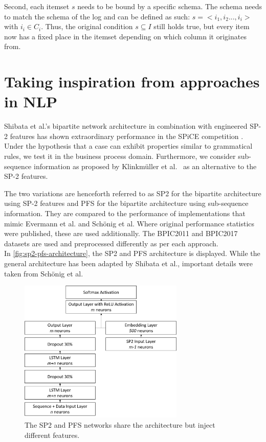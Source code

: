 Second, each itemset $s$ needs to be bound by a specific schema. The schema needs to match the schema of the log and can be defined as such: $s = <i_1, i_2 ..., i_i>$ with $i_i \in C_i$. Thus, the original condition $s \subseteq I$ still holds true, but every item now has a fixed place in the itemset depending on which column it originates from.

\section{Taking inspiration from approaches in NLP}
\label{sec:contrib:nlp-inspiration}
Shibata et al.'s bipartite network architecture in combination with engineered SP-2 features has shown extraordinary performance in the SPiCE competition \cite{web:spice}. Under the hypothesis that a case can exhibit properties similar to grammatical rules, we test it in the business process domain. Furthermore, we consider sub-sequence information as proposed by Klinkmüller et al.~\cite{klinkmuller2018reliablemonitoring} as an alternative to the SP-2 features.

The two variations are henceforth referred to as SP2 for the bipartite architecture using SP-2 features and PFS for the bipartite architecture using sub-sequence information. They are compared to the performance of implementations that mimic Evermann et al. and Schönig et al. Where original performance statistics were published, these are used additionally. The BPIC2011 \cite{BPIC2011} and BPIC2017 \cite{BPIC2017} datasets are used and preprocessed differently as per each approach.\\

In \autoref{fig:sp2-pfs-architecture}, the SP2 and PFS architecture is displayed. While the general architecture has been adapted by Shibata et al., important details were taken from Schönig et al.

\begin{figure}
    \centering
    \includegraphics[width=0.7\textwidth]{gfx/sp2-network-architecture.png}
    \caption{The SP2 and PFS networks share the architecture but inject different features.}
    \label{fig:sp2-pfs-architecture}
\end{figure}

